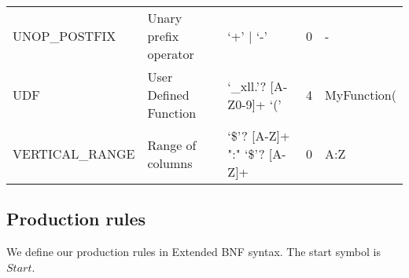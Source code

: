 \documentclass[conference]{IEEEtran}
\begin{document}
\begin{table*}
\begin{tabular}{@{}lllll@{}}
UNOP\_POSTFIX          & Unary prefix operator                                                                                                   & `+' $\mid$ `-'                                                                                                                                                                                         & 0        & -                  \\
UDF                    & User Defined Function                                                                                                   & `\_xll.'? [A-Z0-9]+  `('                                                                                                                                                                       & 4        & MyFunction(        \\
VERTICAL\_RANGE        & Range of columns                                                                                                        & `\$'? [A-Z]+ ":" `\$'? {[}A-Z{]}+                                                                                                                                                                   & 0        & A:Z                \\ \bottomrule
\end{tabular}
\end{table*}

\subsection{Production rules}

We define our production rules in Extended BNF syntax. The start symbol is $Start$.
\end{document}
